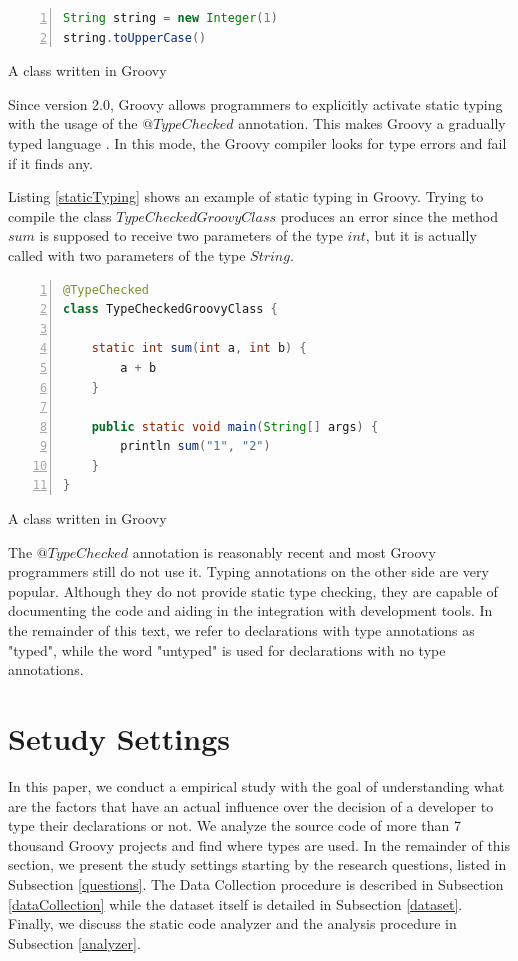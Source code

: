\documentclass[preprint]{sigplanconf}
\begin{document}
\begin{Listing}[ht]
\begin{lstlisting}[language=Java,tabsize=2,breaklines=true,numbers=left]
String string = new Integer(1)
string.toUpperCase()
\end{lstlisting}
\caption{A class written in Groovy}
\label{typeError}
\end{Listing}

Since version 2.0, Groovy allows programmers to explicitly activate static typing with the usage of the $@TypeChecked$ annotation.
This makes Groovy a gradually typed language \cite{gray05,gray08,gray11,siek07,takikawa12}.
In this mode, the Groovy compiler looks for type errors and fail if it finds any.

Listing \ref{staticTyping} shows an example of static typing in Groovy.
Trying to compile the class $TypeCheckedGroovyClass$ produces an error since the method $sum$ is supposed to receive two parameters of the type $int$, but it is actually called with two parameters of the type $String$.

\begin{Listing}[ht]
\begin{lstlisting}[language=Java,tabsize=2,breaklines=true,numbers=left]
@TypeChecked
class TypeCheckedGroovyClass {
	
	static int sum(int a, int b) {
		a + b
	}

	public static void main(String[] args) {
		println sum("1", "2")
	}
}
\end{lstlisting}
\caption{A class written in Groovy}
\label{staticTyping}
\end{Listing}

The $@TypeChecked$ annotation is reasonably recent and most Groovy programmers still do not use it. 
Typing annotations on the other side are very popular.
Although they do not provide static type checking, they are capable of documenting the code and aiding in the integration with development tools.
In the remainder of this text, we refer to declarations with type annotations as "typed", while the word "untyped" is used for declarations with no type annotations.







%
%

\section{Setudy Settings\label{settings}}
In this paper, we conduct a empirical study with the goal of understanding what are the factors that have an actual influence over the decision of a developer to type their declarations or not. 
We analyze the source code of more than 7 thousand Groovy projects and find where types are used.
In the remainder of this section, we present the study settings starting by the research questions, listed in Subsection \ref{questions}. 
The Data Collection procedure is described in Subsection \ref{dataCollection} while the dataset itself is detailed in Subsection \ref{dataset}. 
Finally, we discuss the static code analyzer and the analysis procedure in Subsection \ref{analyzer}.
\end{document}

